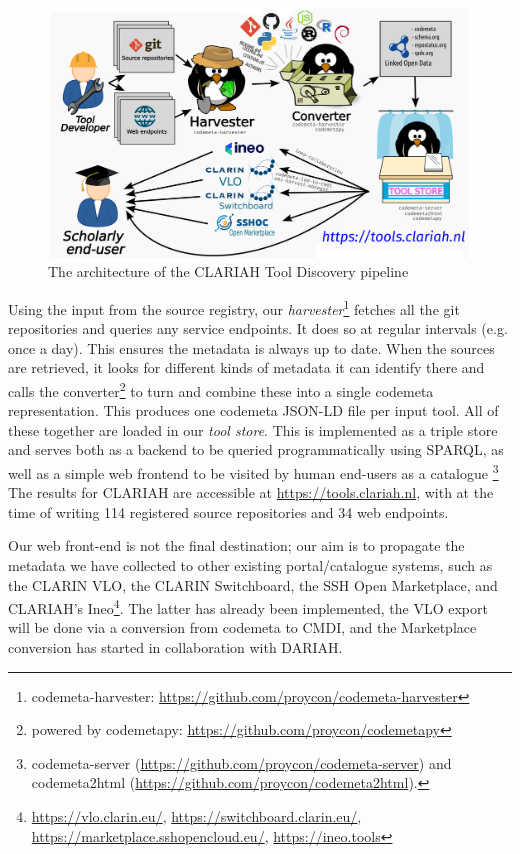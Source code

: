 \documentclass[a4paper,11pt]{article}
\begin{document}
\begin{figure}[h]
\begin{center}
\includegraphics[width=14.0cm]{architecture.png}
\caption{The architecture of the CLARIAH Tool Discovery pipeline}
\end{center}
\label{fig:architecture}
\end{figure}

Using the input from the source registry, our
\emph{harvester}\footnote{codemeta-harvester:
\url{https://github.com/proycon/codemeta-harvester}} fetches all the git
repositories and queries any service endpoints. It does so at regular intervals
(e.g. once a day). This ensures the metadata is always up to date. When the
sources are retrieved, it looks for different kinds of metadata it can identify
there and calls the converter\footnote{powered by codemetapy:
\url{https://github.com/proycon/codemetapy}} to turn and combine these into a
single codemeta representation. This produces one codemeta JSON-LD file per
input tool. All of these together are loaded in our \emph{tool store}. This is
implemented as a triple store and serves both as a backend to be queried
programmatically using SPARQL, as well as a simple web frontend to be visited
by human end-users as a catalogue \footnote{codemeta-server
(\url{https://github.com/proycon/codemeta-server}) and codemeta2html
(\url{https://github.com/proycon/codemeta2html}).} The results for CLARIAH are
accessible at \url{https://tools.clariah.nl}, with at the time of writing
114 registered source repositories and 34 web endpoints.

Our web front-end is not the final destination; our aim is to propagate the
metadata we have collected to other existing portal/catalogue systems, such as
the CLARIN VLO, the CLARIN Switchboard, the SSH Open Marketplace, and CLARIAH's
Ineo\footnote{\url{https://vlo.clarin.eu/},
\url{https://switchboard.clarin.eu/},
\url{https://marketplace.sshopencloud.eu/}, \url{https://ineo.tools}}. The
latter has already been implemented, the VLO export will be done via a conversion
from codemeta to CMDI, and the Marketplace conversion has started in collaboration with
DARIAH.
\end{document}
